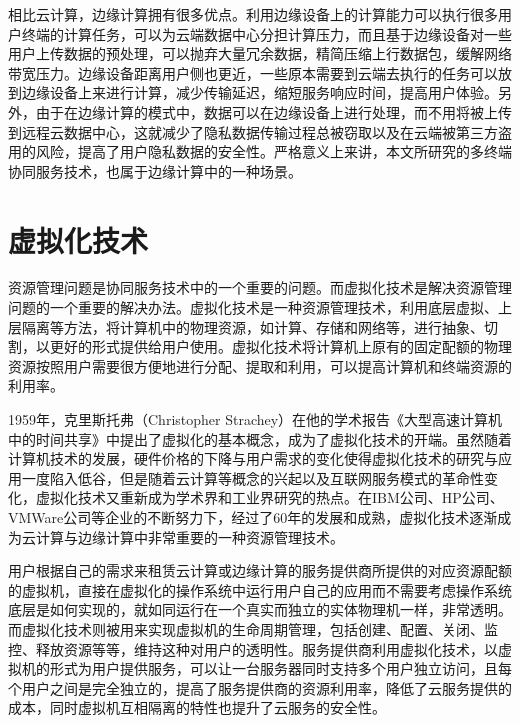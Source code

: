 相比云计算，边缘计算拥有很多优点\cite{赵梓铭2018边缘计算}。利用边缘设备上的计算能力可以执行很多用户终端的计算任务，可以为云端数据中心分担计算压力，而且基于边缘设备对一些用户上传数据的预处理，可以抛弃大量冗余数据，精简压缩上行数据包，缓解网络带宽压力。边缘设备距离用户侧也更近，一些原本需要到云端去执行的任务可以放到边缘设备上来进行计算，减少传输延迟，缩短服务响应时间，提高用户体验。另外，由于在边缘计算的模式中，数据可以在边缘设备上进行处理，而不用将被上传到远程云数据中心，这就减少了隐私数据传输过程总被窃取以及在云端被第三方盗用的风险，提高了用户隐私数据的安全性。严格意义上来讲，本文所研究的多终端协同服务技术，也属于边缘计算中的一种场景。

\section{虚拟化技术}\label{sec:related_work_virtualization}
资源管理问题是协同服务技术中的一个重要的问题\citep{文雨2013面向应用服务级目标的虚拟化资源管理}。而虚拟化技术是解决资源管理问题的一个重要的解决办法。虚拟化技术是一种资源管理技术，利用底层虚拟、上层隔离等方法，将计算机中的物理资源，如计算、存储和网络等，进行抽象、切割，以更好的形式提供给用户使用\cite{goth2007virtualization}。虚拟化技术将计算机上原有的固定配额的物理资源按照用户需要很方便地进行分配、提取和利用，可以提高计算机和终端资源的利用率。

1959年，克里斯托弗（Christopher Strachey）在他的学术报告《大型高速计算机中的时间共享》中提出了虚拟化的基本概念，成为了虚拟化技术的开端\citep{本刊编辑部2017虚拟化概述}。虽然随着计算机技术的发展，硬件价格的下降与用户需求的变化使得虚拟化技术的研究与应用一度陷入低谷，但是随着云计算等概念的兴起以及互联网服务模式的革命性变化，虚拟化技术又重新成为学术界和工业界研究的热点\cite{menasce2005virtualization}。在IBM公司、HP公司、VMWare公司等企业的不断努力下，经过了60年的发展和成熟，虚拟化技术逐渐成为云计算与边缘计算中非常重要的一种资源管理技术\cite{pearce2013virtualization,kumar2014review}。

用户根据自己的需求来租赁云计算或边缘计算的服务提供商所提供的对应资源配额的虚拟机，直接在虚拟化的操作系统中运行用户自己的应用而不需要考虑操作系统底层是如何实现的，就如同运行在一个真实而独立的实体物理机一样，非常透明\cite{叶蔚2019基于虚拟化的}。而虚拟化技术则被用来实现虚拟机的生命周期管理，包括创建、配置、关闭、监控、释放资源等等，维持这种对用户的透明性。服务提供商利用虚拟化技术，以虚拟机的形式为用户提供服务，可以让一台服务器同时支持多个用户独立访问，且每个用户之间是完全独立的，提高了服务提供商的资源利用率，降低了云服务提供的成本，同时虚拟机互相隔离的特性也提升了云服务的安全性。

